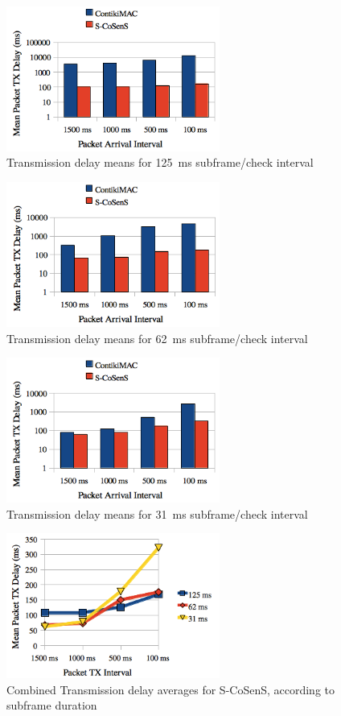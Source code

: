\documentclass[12pt,a4paper]{article}
\begin{document}
\begin{figure}[tbph]
  \centering
  \includegraphics[width=7cm]{graphes/Delays8Hz.png}
  \caption{Transmission delay means for 125~ms subframe/check interval}
  \label{FigDelays8Hz}
\end{figure}
\begin{figure}[tbph]
  \centering
  \includegraphics[width=7cm]{graphes/Delays16Hz.png}
  \caption{Transmission delay means for 62~ms subframe/check interval}
  \label{FigDelays16Hz}
\end{figure}
\begin{figure}[tbph]
  \centering
  \includegraphics[width=7cm]{graphes/Delays32Hz.png}
  \caption{Transmission delay means for 31~ms subframe/check interval}
  \label{FigDelays32Hz}
\end{figure}
\begin{figure}[tbph]
  \centering
  \includegraphics[width=7cm]{graphes/DelaysStabilitySCoSenS.png}
  \caption{Combined Transmission delay averages for S-CoSenS,
           according to subframe duration}
  \label{FigDelaysSCoSenS}
\end{figure}
\end{document}
